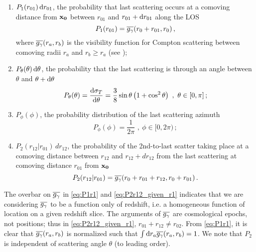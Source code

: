 \documentclass[fleqn,usenatbib]{mnras}
\begin{document}
    \begin{enumerate}[leftmargin=*]
        \item
            $P_1(r_{01})\,\dif{r_{01}}$, the probability that last scattering
            occurs at a comoving distance from $\mathbf{x_0}$ between $r_{01}$ and
            $r_{01}+\dif{r_{01}}$ along the LOS
            \begin{equation}  \label{eq:P1r1}
                P_1(r_{01}) = \overline{g_\gamma}(r_0 + r_{01},r_0)\,,
            \end{equation}
            where $\overline{g_\gamma}(r_a,r_b)$ is the visibility function for Compton
            scattering between comoving radii $r_a$ and $r_b\geq r_a$ (see
            );
        \item
            $P_\theta(\theta)\,\dif{\theta}$, the probability that the last
            scattering is through an angle between $\theta$ and
            $\theta+\dif{\theta}$
            \begin{equation} \label{eq:Ptheta}
                P_\theta(\theta)
                    = \frac{\dif{\sigma_T}}{\dif{\theta}}
                    = \frac{3}{8}\sin\theta\left(1+\cos^2\theta\right)
                      \,\,,\ \theta \in [0, \pi]\,;
            \end{equation}
        \item
            $P_\phi(\phi)$, the probability distribution of the last scattering
            azimuth
            \begin{equation} \label{eq:Pphi}
               P_\phi(\phi) = \frac{1}{2\pi} \,\,,\ \phi \in [0, 2\pi)\,;
            \end{equation}
        \item
            $P_2(r_{12}|r_{01}) \, dr_{12}$, the probability of the 2nd-to-last
            scatter taking place at a comoving distance between $r_{12}$ and
            $r_{12} + dr_{12}$ from the last scattering at comoving distance
            $r_{01}$ from $\mathbf{x_0}$
            \begin{equation} \label{eq:P2r12_given_r1}
                P_2(r_{12}|r_{01}) = \overline{g_\gamma}(r_0 + r_{01}+r_{12},r_0 + r_{01})\,.
            \end{equation}
    \end{enumerate}

    The overbar on $\overline{g_\gamma}$ in \autoref{eq:P1r1} and \ref{eq:P2r12_given_r1}
    indicates that we are considering $\overline{g_\gamma}$ to be a function only of
    redshift, i.e. a homogeneous function of location on a given redshift slice.
    The arguments of $\overline{g_\gamma}$ are cosmological epochs, not positions; thus in
    \autoref{eq:P2r12_given_r1}, $r_{01}+r_{12} \neq r_{02}$.  From
    \autoref{eq:P1r1}, it is clear that $\overline{g_\gamma}(r_a,r_b)$ is normalized such
    that $\int\dif{r_a} \GgamBar(r_a,r_b)=1$.  We note that $P_2$ is independent
    of scattering angle $\theta$ (to leading order).
\end{document}
